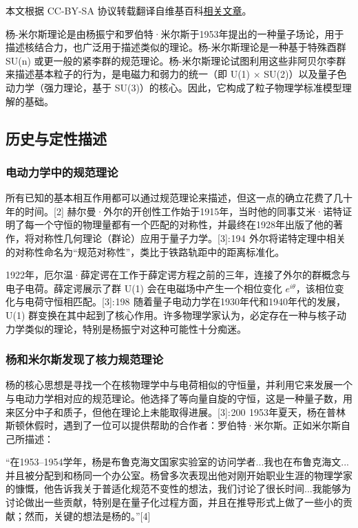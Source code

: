 
本文根据 CC-BY-SA 协议转载翻译自维基百科\href{https://en.wikipedia.org/wiki/Yang\%E2\%80\%93Mills_theory}{相关文章}。

杨-米尔斯理论是由杨振宁和罗伯特·米尔斯于1953年提出的一种量子场论，用于描述核结合力，也广泛用于描述类似的理论。杨-米尔斯理论是一种基于特殊酉群 SU(n) 或更一般的紧李群的规范理论。杨-米尔斯理论试图利用这些非阿贝尔李群来描述基本粒子的行为，是电磁力和弱力的统一（即 U(1) × SU(2)）以及量子色动力学（强力理论，基于 SU(3)）的核心。因此，它构成了粒子物理学标准模型理解的基础。
\subsection{历史与定性描述}  
\subsubsection{电动力学中的规范理论}  
所有已知的基本相互作用都可以通过规范理论来描述，但这一点的确立花费了几十年的时间。[2] 赫尔曼·外尔的开创性工作始于1915年，当时他的同事艾米·诺特证明了每一个守恒的物理量都有一个匹配的对称性，并最终在1928年出版了他的著作，将对称性几何理论（群论）应用于量子力学。[3]: 194  外尔将诺特定理中相关的对称性命名为“规范对称性”，类比于铁路轨距中的距离标准化。

1922年，厄尔温·薛定谔在工作于薛定谔方程之前的三年，连接了外尔的群概念与电子电荷。薛定谔展示了群 U(1) 会在电磁场中产生一个相位变化 \( e^{i\theta} \)，该相位变化与电荷守恒相匹配。[3]: 198  随着量子电动力学在1930年代和1940年代的发展，U(1) 群变换在其中起到了核心作用。许多物理学家认为，必定存在一种与核子动力学类似的理论，特别是杨振宁对这种可能性十分痴迷。
\subsubsection{杨和米尔斯发现了核力规范理论}
杨的核心思想是寻找一个在核物理学中与电荷相似的守恒量，并利用它来发展一个与电动力学相对应的规范理论。他选择了等向量自旋的守恒，这是一种量子数，用来区分中子和质子，但他在理论上未能取得进展。[3]: 200  1953年夏天，杨在普林斯顿休假时，遇到了一位可以提供帮助的合作者：罗伯特·米尔斯。正如米尔斯自己所描述：

“在1953–1954学年，杨是布鲁克海文国家实验室的访问学者...我也在布鲁克海文...并且被分配到和杨同一个办公室。杨曾多次表现出他对刚开始职业生涯的物理学家的慷慨，他告诉我关于普适化规范不变性的想法，我们讨论了很长时间...我能够为讨论做出一些贡献，特别是在量子化过程方面，并且在推导形式上做了一些小的贡献；然而，关键的想法是杨的。”[4]


